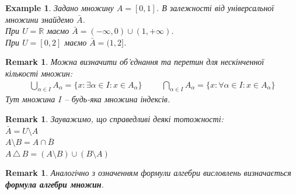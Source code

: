 \documentclass[a4paper, 14pt]{extarticle}
\theoremstyle{theoremdd}
\theoremstyle{theoremdd}
\theoremstyle{theoremdd}
\theoremstyle{theoremdd}
\theoremstyle{theoremdd}
\newtheorem{example}[theorem]{Example}
\theoremstyle{theoremdd}
\theoremstyle{theoremdd}
\theoremstyle{theoremdd}
\theoremstyle{theoremdd}
\theoremstyle{theoremdd}
\theoremstyle{theoremdd}
\newtheorem{remark}[theorem]{Remark}
\theoremstyle{theoremdd}
\theoremstyle{theoremdd}
\theoremstyle{theoremdd}
\theoremstyle{theoremdd}
\newcommand{\symdif}{\,\triangle\,} %
\begin{document}
\begin{example}
Задано множину $A = [0,1]$. В залежності від універсальної множини знайдемо $\bar{A}$.\\
При $U = \mathbb{R}$ маємо $\bar{A} = (-\infty,0) \cup (1,+\infty)$.\\
При $U = [0,2]$ маємо $\bar{A} = (1,2]$.
\end{example}

\begin{remark}
Можна визначити об'єднання та перетин для нескінченної кількості множин:
\begin{align*}
\bigcup_{\alpha \in I} A_{\alpha} = \{x: \exists \alpha \in I: x \in A_{\alpha}\} \hspace{1cm} \bigcap_{\alpha \in I} A_{\alpha} = \{x: \forall \alpha \in I: x \in A_{\alpha}\}
\end{align*}
Тут множина $I$ -- будь-яка множина індексів.
\end{remark}

\begin{remark}
Зауважимо, що справедливі деякі тотожності:\\
$\bar{A} = U \setminus A$\\
$A \setminus B = A \cap \bar{B}$\\
$A \symdif B = (A \setminus B) \cup (B \setminus A)$
\end{remark}

\begin{remark}
Аналогічно з означенням формули алгебри висловлень визначається \textbf{формула алгебри множин}.
\end{remark}
\end{document}
